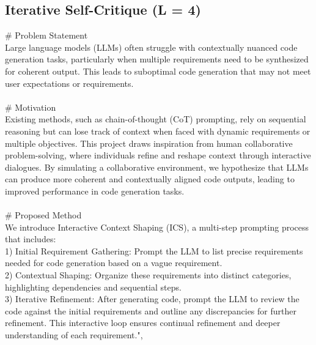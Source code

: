 \subsection{Iterative Self-Critique (L = 4)}
{\centering
\begin{tcolorbox}[
    colframe=green!50!black, 
    colback=green!10!white, 
    title=Interactive Context Shaping: Enhancing Code Generation in Large Language Models through Collaborative Prompting, 
    width=0.95\textwidth,
    boxsep=3pt
]
\# Problem Statement \\
Large language models (LLMs) often struggle with contextually nuanced code generation tasks, particularly when multiple requirements need to be synthesized for coherent output. This leads to suboptimal code generation that may not meet user expectations or requirements.
\\
\\
\# Motivation \\
Existing methods, such as chain-of-thought (CoT) prompting, rely on sequential reasoning but can lose track of context when faced with dynamic requirements or multiple objectives. This project draws inspiration from human collaborative problem-solving, where individuals refine and reshape context through interactive dialogues. By simulating a collaborative environment, we hypothesize that LLMs can produce more coherent and contextually aligned code outputs, leading to improved performance in code generation tasks.
\\
\\
\# Proposed Method \\
We introduce Interactive Context Shaping (ICS), a multi-step prompting process that includes: \\
1) Initial Requirement Gathering: Prompt the LLM to list precise requirements needed for code generation based on a vague requirement. \\
2) Contextual Shaping: Organize these requirements into distinct categories, highlighting dependencies and sequential steps. \\
3) Iterative Refinement: After generating code, prompt the LLM to review the code against the initial requirements and outline any discrepancies for further refinement. This interactive loop ensures continual refinement and deeper understanding of each requirement.",  
\end{tcolorbox}
\par}
\clearpage

